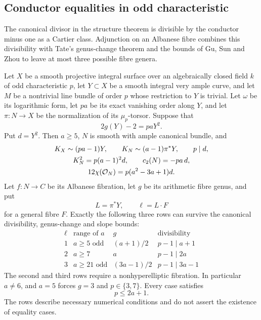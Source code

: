 \subsection{Conductor equalities in odd characteristic}
\label{subsec:odd-higher-conductor}

The canonical divisor in the structure theorem is divisible by the
conductor minus one as a Cartier class. Adjunction on an Albanese
fibre combines this divisibility with Tate's genus-change theorem
and the bounds of Gu, Sun and Zhou to leave at most three possible
fibre genera.

\begin{proposition}\label{prop:odd-higher-conductor-equality}
Let $X$ be a smooth projective integral surface over an algebraically
closed field $k$ of odd characteristic $p$, let $Y\subset X$ be a smooth
integral very ample curve, and let $M$ be a nontrivial line bundle of
order $p$ whose restriction to $Y$ is trivial. Let $\omega$ be its
logarithmic form, let $pa$ be its exact vanishing order along $Y$, and
let $\pi:N\to X$ be the normalization of its $\mu_p$-torsor. Suppose
that
\[
 2g(Y)-2=paY^2.
\]
Put $d=Y^2$. Then $a\geq5$, $N$ is smooth with ample
canonical bundle, and
\begin{equation}\label{eq:odd-conductor-invariants}
\begin{gathered}
 K_X\sim(pa-1)Y,\qquad K_N\sim(a-1)\pi^*Y,\qquad p\mid d,\\
 K_N^2=p(a-1)^2d,\qquad c_2(N)=-pa\,d,\\
 12\chi(\mathcal O_N)=p(a^2-3a+1)d.
\end{gathered}
\end{equation}
Let $f:N\to C$ be its Albanese fibration, let $g$ be its
arithmetic fibre genus, and put
\[
 L=\pi^*Y,\qquad \ell=L\cdot F
\]
for a general fibre $F$. Exactly the following three rows can
survive the canonical divisibility, genus-change and slope bounds:
\begin{equation}\label{eq:odd-conductor-three-genera}
\begin{array}{c|c|c|c}
 \ell&\text{range of }a&g&\text{divisibility}\\ \hline
 1&a\geq5\text{ odd}&(a+1)/2&p-1\mid a+1\\
 2&a\geq7&a&p-1\mid2a\\
 3&a\geq21\text{ odd}&(3a-1)/2&p-1\mid3a-1
\end{array}
\end{equation}
The second and third rows require a nonhyperelliptic fibration.
In particular $a\ne6$, and $a=5$ forces $g=3$ and
$p\in\{3,7\}$. Every case satisfies
\begin{equation}\label{eq:odd-conductor-characteristic-bound}
 p\leq2a+1.
\end{equation}
The rows describe necessary numerical conditions and do not assert
the existence of equality cases.
\end{proposition}

